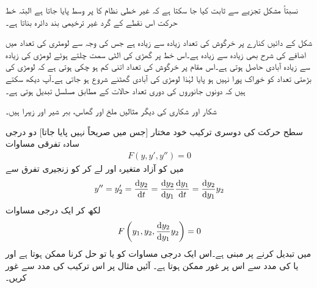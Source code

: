 نسبتاً مشکل تجزیے سے ثابت کیا جا سکتا ہے کہ غیر خطی نظام  کا   پر وسط پایا جاتا ہے البتہ خط حرکت اس نقطے کے گرد غیر ترخیمی بند دائرہ بناتا ہے۔

شکل  کے دائیں کنارے پر خرگوش کی تعداد  زیادہ سے زیادہ ہے جس کی وجہ سے لومٹری کی تعداد  میں اضافے کی شرح بھی زیادہ سے زیادہ ہے۔اس خط پر گھڑی کی الٹی سمت چلتے ہوئے لومڑی کی زیادہ سے زیادہ آبادی حاصل ہوتی ہے۔اس مقام پر خرگوش کی تعداد اتنی کم ہو چکی ہوتی ہے کہ لومڑی کی بڑھتی تعداد کو خوراک پورا نہیں ہو پایا لہٰذا لومڑی کی آبادی گھٹنے شروع ہو جاتی ہے۔آپ دیکھ سکتے ہیں کہ دونوں جانوروں کی دوری تعداد حالات کے مطابق مسلسل تبدیل ہوتی ہے۔

شکار اور شکاری کی دیگر مثالیں ملخ اور گھاس، ببر شیر اور زیبرا ہیں۔


سطح حرکت کی دوسری ترکیب خود مختار [جس میں  صریحاً نہیں پایا جاتا] دو درجی سادہ تفرقی مساوات
\begin{align*}
F(y,y',y'')=0
\end{align*}
میں  کو آزاد متغیرہ اور  لے کر  کو زنجیری تفرق سے
\begin{align*}
y''=y_2'=\frac{\dif y_2}{\dif t}=\frac{\dif y_2}{\dif y_1}\frac{\dif y_1}{\dif t}=\frac{\dif y_2}{\dif y_1}y_2
\end{align*}
لکھ کر ایک درجی مساوات
\begin{align}
F\left(y_1,y_2,\frac{\dif y_2}{\dif y_1}y_2\right)=0
\end{align}
میں تبدیل کرنے پر مبنی ہے۔اس ایک درجی مساوات کو یا تو حل کرنا ممکن ہوتا ہے اور یا  کی مدد سے اس پر غور ممکن ہوتا ہے۔ آئیں مثال  پر اس ترکیب کی مدد سے غور کریں۔

